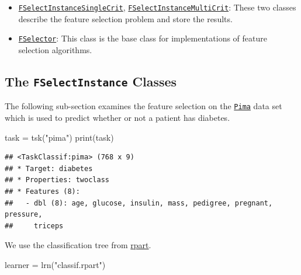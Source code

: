 \documentclass[
]{scrbook}
\newenvironment{Shaded}{\begin{snugshade}}{\end{snugshade}}
\newcommand{\FunctionTok}[1]{\textcolor[rgb]{0.00,0.00,0.00}{#1}}
\newcommand{\NormalTok}[1]{#1}
\newcommand{\OtherTok}[1]{\textcolor[rgb]{0.56,0.35,0.01}{#1}}
\newcommand{\StringTok}[1]{\textcolor[rgb]{0.31,0.60,0.02}{#1}}
\providecommand{\tightlist}{%
  \setlength{\itemsep}{0pt}\setlength{\parskip}{0pt}}
\renewenvironment{Shaded} {\begin{snugshade}\small} {\end{snugshade}}
\begin{document}
\begin{itemize}
\tightlist
\item
  \href{https://mlr3fselect.mlr-org.com/reference/FSelectInstanceSingleCrit.html}{\texttt{FSelectInstanceSingleCrit}}, \href{https://mlr3fselect.mlr-org.com/reference/FSelectInstanceMultiCrit.html}{\texttt{FSelectInstanceMultiCrit}}: These two classes describe the feature selection problem and store the results.
\item
  \href{https://mlr3fselect.mlr-org.com/reference/FSelector.html}{\texttt{FSelector}}: This class is the base class for implementations of feature selection algorithms.
\end{itemize}

\hypertarget{fs-wrapper-optimization}{%
\subsection{\texorpdfstring{The \texttt{FSelectInstance} Classes}{The FSelectInstance Classes}}\label{fs-wrapper-optimization}}

The following sub-section examines the feature selection on the \href{https://mlr3.mlr-org.com/reference/mlr_tasks_pima.html}{\texttt{Pima}} data set which is used to predict whether or not a patient has diabetes.

\begin{Shaded}
\begin{Highlighting}[]
\NormalTok{task }\OtherTok{=} \FunctionTok{tsk}\NormalTok{(}\StringTok{"pima"}\NormalTok{)}
\FunctionTok{print}\NormalTok{(task)}
\end{Highlighting}
\end{Shaded}

\begin{verbatim}
## <TaskClassif:pima> (768 x 9)
## * Target: diabetes
## * Properties: twoclass
## * Features (8):
##   - dbl (8): age, glucose, insulin, mass, pedigree, pregnant, pressure,
##     triceps
\end{verbatim}

We use the classification tree from \href{https://cran.r-project.org/package=rpart}{rpart}.

\begin{Shaded}
\begin{Highlighting}[]
\NormalTok{learner }\OtherTok{=} \FunctionTok{lrn}\NormalTok{(}\StringTok{"classif.rpart"}\NormalTok{)}
\end{Highlighting}
\end{Shaded}
\end{document}
